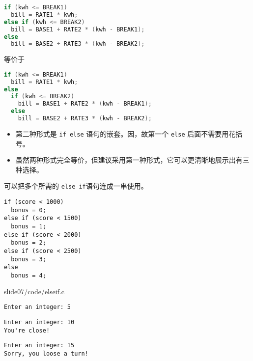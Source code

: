 \begin{frame}[fragile]
\begin{lstlisting}[language=c,frame=single]
if (kwh <= BREAK1)
  bill = RATE1 * kwh;
else if (kwh <= BREAK2)
  bill = BASE1 + RATE2 * (kwh - BREAK1);
else
  bill = BASE2 + RATE3 * (kwh - BREAK2);
\end{lstlisting}
等价于
\begin{lstlisting}[language=c,frame=single]
if (kwh <= BREAK1)
  bill = RATE1 * kwh;
else 
  if (kwh <= BREAK2)
    bill = BASE1 + RATE2 * (kwh - BREAK1);
  else
    bill = BASE2 + RATE3 * (kwh - BREAK2);
\end{lstlisting}
\end{frame}


\begin{frame}[fragile]
\begin{itemize}
\item
第二种形式是 \lstinline|if else| 语句的嵌套。因，故第一个 \lstinline|else| 后面不需要用花括号。\\[0.1in]
\item 
虽然两种形式完全等价，但建议采用第一种形式，它可以更清晰地展示出有三种选择。
\end{itemize}
\end{frame}


\begin{frame}[fragile]
可以把多个所需的 \lstinline|else if|语句连成一串使用。
\begin{lstlisting}
if (score < 1000)
  bonus = 0;
else if (score < 1500)
  bonus = 1;
else if (score < 2000)
  bonus = 2;
else if (score < 2500)
  bonus = 3;
else
  bonus = 4;    
\end{lstlisting}
\end{frame}

\begin{frame}[fragile]

{slide07/code/elseif.c}
\end{frame}

\begin{frame}[fragile]
\begin{lstlisting}
Enter an integer: 5
\end{lstlisting} \pause
 
\begin{lstlisting}
Enter an integer: 10
You're close!
\end{lstlisting} \pause 

\begin{lstlisting}
Enter an integer: 15
Sorry, you loose a turn!
\end{lstlisting}
\end{frame}

